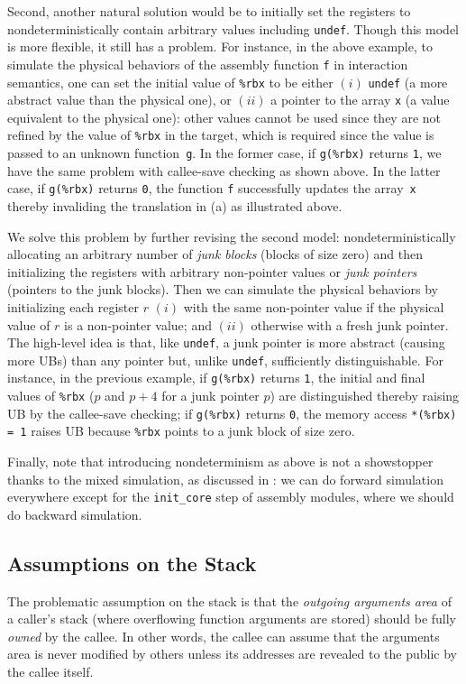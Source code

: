 Second, another natural solution would be to initially set the
\nip{} registers to nondeterministically contain arbitrary
values including \texttt{undef}. Though this model is more flexible,
it still has a problem. For instance, in the above example, to
simulate the physical behaviors of the assembly function \texttt{f} in
interaction semantics, one can set the initial value of \texttt{\%rbx} to
be either $(i)$ \texttt{undef} (\ie a more abstract value than the physical one), or
$(ii)$ a pointer to the array \texttt{x} (\ie a value equivalent to the physical one):
other values cannot be used since they are not refined by the value of \texttt{\%rbx} in the target,
which is required since the value is passed to an unknown function~\texttt{g}.
In the former case, if
\texttt{g(\%rbx)} returns \texttt{1}, we have the same problem with
callee-save checking as shown above.  In the latter case, if
\texttt{g(\%rbx)} returns \texttt{0}, the function \texttt{f}
successfully updates the array~\texttt{x} thereby invaliding the
translation in (a) as illustrated above.

We solve this problem by further revising the second model:
nondeterministically allocating an arbitrary number of \emph{junk
  blocks} (\ie blocks of size zero) and then initializing the
\nip{} registers with arbitrary non-pointer values or
\emph{junk pointers} (\ie pointers to the junk blocks).  Then we can
simulate the physical behaviors by initializing each register $r$
$(i)$ with the same non-pointer value if the physical value of $r$ is
a non-pointer value; and $(ii)$ otherwise with a fresh junk pointer.
The high-level idea is that, like \texttt{undef}, a junk pointer is
more abstract (\ie causing more UBs) than any pointer but, unlike
\texttt{undef}, sufficiently distinguishable. For instance,
in the previous example, if \texttt{g(\%rbx)} returns \texttt{1},
the initial and final values of \texttt{\%rbx} (\ie $p$ and $p+4$ for a junk pointer $p$)
are distinguished thereby raising UB by the callee-save checking;
if \texttt{g(\%rbx)} returns \texttt{0},
the memory access \texttt{*(\%rbx) = 1} raises UB because \texttt{\%rbx}
points to a junk block of size zero.

Finally, note that introducing nondeterminism as above is not a
showstopper thanks to the mixed simulation, as discussed in
: we can do forward
simulation everywhere except for the \texttt{init\_core} step of
assembly modules, where we should do backward simulation.

\subsection{Assumptions on the Stack}
\label{sec:overview-semantics-memory}
%
The problematic assumption on the stack is that the
\emph{outgoing arguments area} of a caller's stack (\ie where overflowing function
arguments are stored) should be fully \emph{owned} by the callee. In
other words, the callee can assume that the arguments area is never
modified by others unless its addresses are revealed to the public by
the callee itself.

